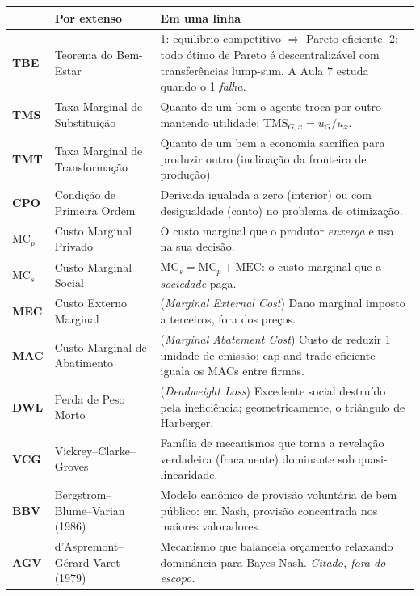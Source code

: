 \documentclass[11pt]{article}
\newcommand{\TMS}{\text{TMS}}
\newcommand{\MEC}{\text{MEC}}
\newcommand{\MCp}{\text{MC}_p}
\newcommand{\MCs}{\text{MC}_s}
\begin{document}
\renewcommand{\arraystretch}{1.35}
\begin{center}
\begin{tabular}{>{\bfseries\color{insperdark}}p{2.2cm} p{4.8cm} p{8.0cm}}
\multicolumn{1}{l}{\bfseries\color{insperred}Sigla} & \multicolumn{1}{l}{\bfseries\color{insperred}Por extenso} & \multicolumn{1}{l}{\bfseries\color{insperred}Em uma linha}\\
\hline
TBE & Teorema do Bem-Estar & 1\textordmasculine{}: equilíbrio competitivo $\Rightarrow$ Pareto-eficiente. 2\textordmasculine{}: todo ótimo de Pareto é descentralizável com transferências lump-sum. A Aula 7 estuda quando o 1\textordmasculine{} \emph{falha}.\\
TMS & Taxa Marginal de Substituição & Quanto de um bem o agente troca por outro mantendo utilidade: $\TMS_{G,x}=u_G/u_x$.\\
TMT & Taxa Marginal de Transformação & Quanto de um bem a economia sacrifica para produzir outro (inclinação da fronteira de produção).\\
CPO & Condição de Primeira Ordem & Derivada igualada a zero (interior) ou com desigualdade (canto) no problema de otimização.\\
$\MCp$ & Custo Marginal Privado & O custo marginal que o produtor \emph{enxerga} e usa na sua decisão.\\
$\MCs$ & Custo Marginal Social & $\MCs=\MCp+\MEC$: o custo marginal que a \emph{sociedade} paga.\\
MEC & Custo Externo Marginal & (\emph{Marginal External Cost}) Dano marginal imposto a terceiros, fora dos preços.\\
MAC & Custo Marginal de Abatimento & (\emph{Marginal Abatement Cost}) Custo de reduzir 1 unidade de emissão; cap-and-trade eficiente iguala os MACs entre firmas.\\
DWL & Perda de Peso Morto & (\emph{Deadweight Loss}) Excedente social destruído pela ineficiência; geometricamente, o triângulo de Harberger.\\
VCG & Vickrey--Clarke--Groves & Família de mecanismos que torna a revelação verdadeira (fracamente) dominante sob quasi-linearidade.\\
BBV & Bergstrom--Blume--Varian (1986) & Modelo canônico de provisão voluntária de bem público: em Nash, provisão concentrada nos maiores valoradores.\\
AGV & d'Aspremont--Gérard-Varet (1979) & Mecanismo que balanceia orçamento relaxando dominância para Bayes-Nash. \emph{Citado, fora do escopo.}\\

\end{tabular}
\end{center}
\end{document}
